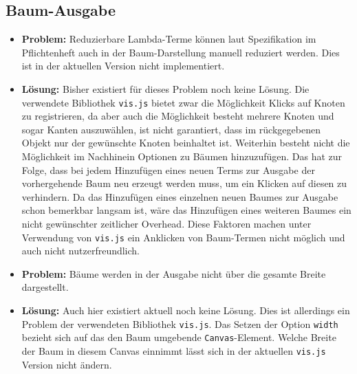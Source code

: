 \documentclass[parskip=full,11pt]{scrartcl}
\begin{document}
\subsection{Baum-Ausgabe}
\begin{itemize}
\item[] \textbf{Problem:} Reduzierbare Lambda-Terme können laut Spezifikation im Pflichtenheft auch in der Baum-Darstellung manuell reduziert werden. Dies ist in der aktuellen Version nicht implementiert.
\item[] \textbf{Lösung:} Bisher existiert für dieses Problem noch keine Lösung. Die verwendete Bibliothek \texttt{vis.js} bietet zwar die Möglichkeit Klicks auf Knoten zu registrieren, da aber auch die Möglichkeit besteht mehrere Knoten und sogar Kanten auszuwählen, ist nicht garantiert, dass im rückgegebenen Objekt nur der gewünschte Knoten beinhaltet ist. Weiterhin besteht nicht die Möglichkeit im Nachhinein Optionen zu Bäumen hinzuzufügen. Das hat zur Folge, dass bei jedem Hinzufügen eines neuen Terms zur Ausgabe der vorhergehende Baum neu erzeugt werden muss, um ein Klicken auf diesen zu verhindern. Da das Hinzufügen eines einzelnen neuen Baumes zur Ausgabe schon bemerkbar langsam ist, wäre das Hinzufügen eines weiteren Baumes ein nicht gewünschter zeitlicher Overhead.
Diese Faktoren machen unter Verwendung von \texttt{vis.js} ein Anklicken von Baum-Termen nicht möglich und auch nicht nutzerfreundlich. 

\item[] \textbf{Problem:} Bäume werden in der Ausgabe nicht über die gesamte Breite dargestellt.
\item[] \textbf{Lösung:} Auch hier existiert aktuell noch keine Lösung. Dies ist allerdings ein Problem der verwendeten Bibliothek \texttt{vis.js}. Das Setzen der Option \texttt{width} bezieht sich auf das den Baum umgebende \texttt{Canvas}-Element. Welche Breite der Baum in diesem Canvas einnimmt lässt sich in der aktuellen \texttt{vis.js} Version nicht ändern.
\end{itemize}


\newpage
\end{document}
